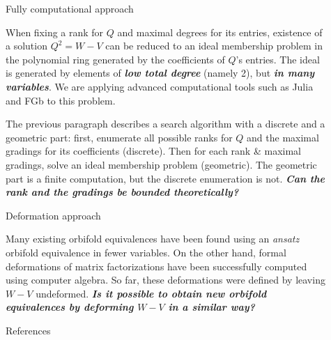 \documentclass[final]{beamer}
\newlength{\sepwid}
\newlength{\onecolwid}
\begin{document}
\begin{frame}[t]
\begin{columns}[t]
\begin{column}{\onecolwid} %

\begin{block}{Fully computational approach}

When fixing a rank for $Q$ and maximal degrees for its entries, existence
of a solution $Q^{2}=W-V$ can be reduced to an ideal membership problem
in the polynomial ring generated by the coefficients of $Q$'s entries.
The ideal is generated by elements of \textbf{\emph{low total degree}}
(namely 2), but \textbf{\emph{in many variables}}. We are applying
advanced computational tools such as Julia and FGb
to this problem.

The previous paragraph describes a search algorithm with a discrete
and a geometric part: first, enumerate all possible ranks for $Q$
and the maximal gradings for its coefficients (discrete). Then for
each rank \& maximal gradings, solve an ideal membership problem (geometric).
The geometric part is a finite computation, but the discrete enumeration
is not. \textbf{\emph{Can the rank and the gradings be bounded theoretically?}}
\end{block}

\begin{block}{Deformation approach}

Many existing orbifold equivalences have been found using an \emph{ansatz}
orbifold equivalence in fewer variables. On the other
hand, formal deformations of matrix factorizations have been successfully
computed using computer algebra. So far, these deformations
were defined by leaving $W-V$ undeformed. \textbf{\emph{Is it possible
to obtain new orbifold equivalences by deforming $W-V$ in a similar
way?}}
\end{block}

\begin{block}{References}

\nocite{*} %
\small{
\vspace{0.75in}}

\end{block}

\end{column} %

\begin{column}{\sepwid}\end{column} %

\begin{column}{\onecolwid} %


\end{column}
\end{columns}
\end{frame}
\end{document}

